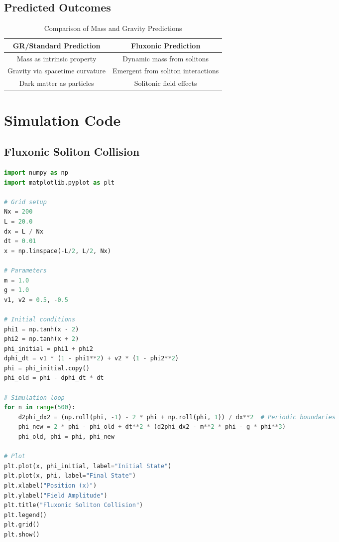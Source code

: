\documentclass{article}
\begin{document}
\subsection{Predicted Outcomes}
\begin{table}[h]
    \centering
    \begin{tabular}{|c|c|}
        \hline
        \textbf{GR/Standard Prediction} & \textbf{Fluxonic Prediction} \\
        \hline
        Mass as intrinsic property & Dynamic mass from solitons \\
        Gravity via spacetime curvature & Emergent from soliton interactions \\
        Dark matter as particles & Solitonic field effects \\
        \hline
    \end{tabular}
    \caption{Comparison of Mass and Gravity Predictions}
    \label{tab:predictions}
\end{table}

\section{Simulation Code}
\subsection{Fluxonic Soliton Collision}
\begin{lstlisting}[language=Python, caption=Fluxonic Soliton Collision Simulation, label=lst:soliton]
import numpy as np
import matplotlib.pyplot as plt

# Grid setup
Nx = 200
L = 20.0
dx = L / Nx
dt = 0.01
x = np.linspace(-L/2, L/2, Nx)

# Parameters
m = 1.0
g = 1.0
v1, v2 = 0.5, -0.5

# Initial conditions
phi1 = np.tanh(x - 2)
phi2 = np.tanh(x + 2)
phi_initial = phi1 + phi2
dphi_dt = v1 * (1 - phi1**2) + v2 * (1 - phi2**2)
phi = phi_initial.copy()
phi_old = phi - dphi_dt * dt

# Simulation loop
for n in range(500):
    d2phi_dx2 = (np.roll(phi, -1) - 2 * phi + np.roll(phi, 1)) / dx**2  # Periodic boundaries
    phi_new = 2 * phi - phi_old + dt**2 * (d2phi_dx2 - m**2 * phi - g * phi**3)
    phi_old, phi = phi, phi_new

# Plot
plt.plot(x, phi_initial, label="Initial State")
plt.plot(x, phi, label="Final State")
plt.xlabel("Position (x)")
plt.ylabel("Field Amplitude")
plt.title("Fluxonic Soliton Collision")
plt.legend()
plt.grid()
plt.show()
\end{lstlisting}
\end{document}
